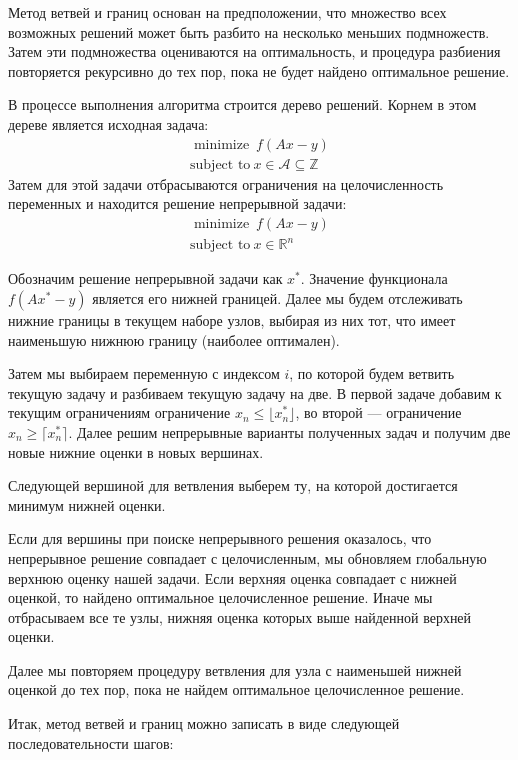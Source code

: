\documentclass[12pt]{article}
\begin{document}
Метод ветвей и границ основан на предположении, что множество всех возможных решений может быть разбито на несколько меньших подмножеств. Затем эти подмножества оцениваются на оптимальность, и процедура разбиения повторяется рекурсивно до тех пор, пока не будет найдено оптимальное решение.

В процессе выполнения алгоритма строится дерево решений. Корнем в этом дереве является исходная задача:
$$
\begin{gathered}
\operatorname{minimize} \ f(Ax - y) \\
\text{subject to} \ x \in \mathcal{A} \subseteq \mathbb{Z}
\end{gathered}
$$
Затем для этой задачи отбрасываются ограничения на целочисленность переменных и находится решение непрерывной задачи:
$$
\begin{gathered}
\operatorname{minimize} \ f(Ax - y) \\
\text{subject to} \ x \in \mathbb{R}^n
\end{gathered}
$$

Обозначим решение непрерывной задачи как $x^*$. Значение функционала $f(Ax^* - y)$ является его нижней границей. Далее мы будем отслеживать нижние границы в текущем наборе узлов, выбирая из них тот, что имеет наименьшую нижнюю границу (наиболее оптимален).

Затем мы выбираем переменную с индексом $i$, по которой будем ветвить текущую задачу и разбиваем текущую задачу на две. В первой задаче добавим к текущим ограничениям ограничение $x_n \le \lfloor x_n^* \rfloor$, во второй — ограничение $x_n \ge \lceil x_n^* \rceil$. Далее решим непрерывные варианты полученных задач и получим две новые нижние оценки в новых вершинах.

Следующей вершиной для ветвления выберем ту, на которой достигается минимум нижней оценки.

Если для вершины при поиске непрерывного решения оказалось, что непрерывное решение совпадает с целочисленным, мы обновляем глобальную верхнюю оценку нашей задачи. Если верхняя оценка совпадает с нижней оценкой, то найдено оптимальное целочисленное решение. Иначе мы отбрасываем все те узлы, нижняя оценка которых выше найденной верхней оценки.

Далее мы повторяем процедуру ветвления для узла с наименьшей нижней оценкой до тех пор, пока не найдем оптимальное целочисленное решение.

Итак, метод ветвей и границ можно записать в виде следующей последовательности шагов:
\end{document}
